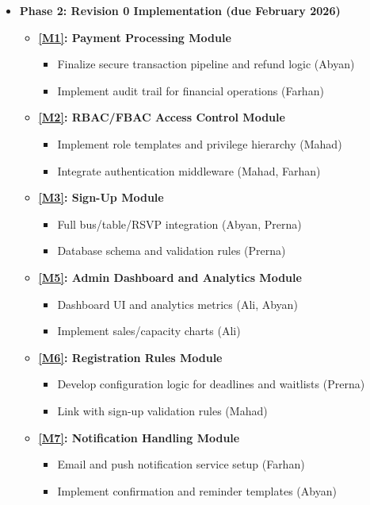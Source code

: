 \documentclass[12pt, titlepage]{article}
\begin{document}
\begin{itemize}
    \item \textbf{Phase 2: Revision 0 Implementation (due February 2026)}  
    \begin{itemize}
        \item \textbf{\ref{M1}: Payment Processing Module}  
        \begin{itemize}
            \item Finalize secure transaction pipeline and refund logic (Abyan)  
            \item Implement audit trail for financial operations (Farhan)
        \end{itemize}
        \item \textbf{\ref{M2}: RBAC/FBAC Access Control Module}  
        \begin{itemize}
            \item Implement role templates and privilege hierarchy (Mahad)  
            \item Integrate authentication middleware (Mahad, Farhan)
        \end{itemize}
        \item \textbf{\ref{M3}: Sign-Up Module}  
        \begin{itemize}
            \item Full bus/table/RSVP integration (Abyan, Prerna)  
            \item Database schema and validation rules (Prerna)
        \end{itemize}
        \item \textbf{\ref{M5}: Admin Dashboard and Analytics Module}  
        \begin{itemize}
            \item Dashboard UI and analytics metrics (Ali, Abyan)  
            \item Implement sales/capacity charts (Ali)
        \end{itemize}
        \item \textbf{\ref{M6}: Registration Rules Module}  
        \begin{itemize}
            \item Develop configuration logic for deadlines and waitlists (Prerna)  
            \item Link with sign-up validation rules (Mahad)
        \end{itemize}
        \item \textbf{\ref{M7}: Notification Handling Module}  
        \begin{itemize}
            \item Email and push notification service setup (Farhan)  
            \item Implement confirmation and reminder templates (Abyan)
        \end{itemize}
    \end{itemize}


\end{itemize}
\end{document}

